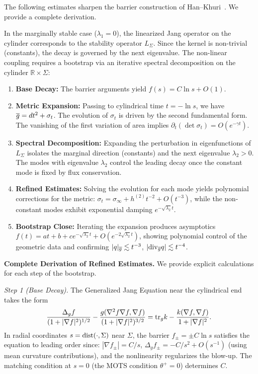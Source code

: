 \begin{lemma}\label{lem:RefinedDecay}
The following estimates sharpen the barrier construction of Han--Khuri~\cite{hankhuri2013}. We provide a complete derivation.

In the marginally stable case ($\lambda_1=0$), the linearized Jang operator on the cylinder corresponds to the stability operator $L_\Sigma$. Since the kernel is non-trivial (constants), the decay is governed by the next eigenvalue. The non-linear coupling requires a bootstrap via an iterative spectral decomposition on the cylinder $\mathbb{R} \times \Sigma$:
\begin{enumerate}
    \item \textbf{Base Decay:} The barrier arguments yield $f(s) = C\ln s + O(1)$.
    \item \textbf{Metric Expansion:} Passing to cylindrical time $t=-\ln s$, we have $\overline{g} = dt^2 + \sigma_t$. The evolution of $\sigma_t$ is driven by the second fundamental form. The vanishing of the first variation of area implies $\partial_t (\det \sigma_t) = O(e^{-\gamma t})$.
    \item \textbf{Spectral Decomposition:} Expanding the perturbation in eigenfunctions of $L_\Sigma$ isolates the marginal direction (constants) and the next eigenvalue $\lambda_2>0$. The modes with eigenvalue $\lambda_2$ control the leading decay once the constant mode is fixed by flux conservation.
    \item \textbf{Refined Estimates:} Solving the evolution for each mode yields polynomial corrections for the metric: $\sigma_t = \sigma_\infty + h^{(2)}t^{-2} + O(t^{-3})$, while the non-constant modes exhibit exponential damping $e^{-\sqrt{\lambda_2} t}$.
    \item \textbf{Bootstrap Close:} Iterating the expansion produces asymptotics $f(t) = at + b + c e^{-\sqrt{\lambda_2} t} + O(e^{-2\sqrt{\lambda_2} t})$, showing polynomial control of the geometric data and confirming $|q|_{\overline{g}} \lesssim t^{-3}$, $|\mathrm{div}_{\overline{g}} q| \lesssim t^{-4}$.
\end{enumerate}

\textbf{Complete Derivation of Refined Estimates.}
We provide explicit calculations for each step of the bootstrap.

\textit{Step 1 (Base Decay).} The Generalized Jang Equation near the cylindrical end takes the form
\[
    \frac{\Delta_g f}{(1+|\nabla f|^2)^{1/2}} - \frac{g(\nabla^2 f \nabla f, \nabla f)}{(1+|\nabla f|^2)^{3/2}} = \mathrm{tr}_g k - \frac{k(\nabla f, \nabla f)}{1+|\nabla f|^2}.
\]
In radial coordinates $s = \mathrm{dist}(\cdot, \Sigma)$ near $\Sigma$, the barrier $f_{\pm} = \pm C \ln s$ satisfies the equation to leading order since: $|\nabla f_{\pm}| = C/s$, $\Delta_g f_{\pm} = -C/s^2 + O(s^{-1})$ (using mean curvature contributions), and the nonlinearity regularizes the blow-up. The matching condition at $s=0$ (the MOTS condition $\theta^+ = 0$) determines $C$.


\end{lemma}
